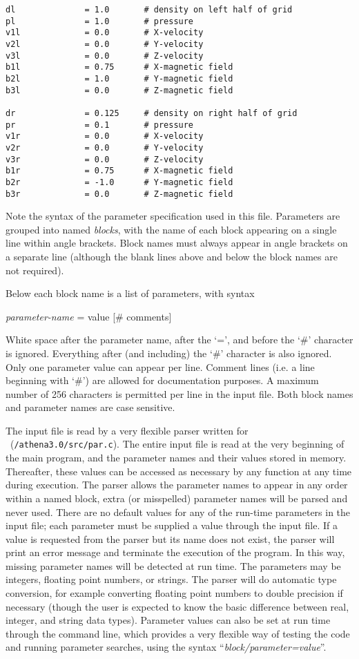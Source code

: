 \begin{verbatim}
dl              = 1.0       # density on left half of grid
pl              = 1.0       # pressure
v1l             = 0.0       # X-velocity
v2l             = 0.0       # Y-velocity
v3l             = 0.0       # Z-velocity
b1l             = 0.75      # X-magnetic field
b2l             = 1.0       # Y-magnetic field
b3l             = 0.0       # Z-magnetic field

dr              = 0.125     # density on right half of grid
pr              = 0.1       # pressure
v1r             = 0.0       # X-velocity
v2r             = 0.0       # Y-velocity
v3r             = 0.0       # Z-velocity
b1r             = 0.75      # X-magnetic field
b2r             = -1.0      # Y-magnetic field
b3r             = 0.0       # Z-magnetic field
\end{verbatim}
\normalsize

Note the syntax of the parameter specification used in this file.
Parameters are grouped into named {\it blocks}, with the name of each
block appearing on a single line within angle brackets.  Block names
must always appear in angle brackets on a separate line (although the
blank lines above and below the block names are not required).

Below each block name is a list of parameters, with syntax
\begin{center}
 {\it parameter-name} = value [\# comments]
\end{center}
White space after the parameter name, after the `=', and before the
`\#' character is ignored.  Everything after (and including) the `\#'
character is also ignored.  Only one parameter value can appear per
line.  Comment lines (i.e. a line beginning with `\#') are allowed for
documentation purposes.  A maximum number of 256 characters is permitted
per line in the input file.  Both block names and parameter names are
case sensitive.

The input file is read by a very flexible parser written for \ath\
({\tt /athena3.0/src/par.c}).  The entire input file is read at the
very beginning of the main program, and the parameter names and their
values stored in memory.  Thereafter, these values can be accessed as
necessary by any function at any time during execution.  The parser
allows the parameter names to appear in any order within a named
block, extra (or misspelled) parameter names will be parsed and never
used.  There are no default values for any of the run-time parameters
in the input file; each parameter must be supplied a value through the
input file.  If a value is requested from the parser but its name does
not exist, the parser will print an error message and terminate the
execution of the program.  In this way, missing
parameter names will be detected at run time.  The parameters may be
integers, floating point numbers, or strings.  The parser will do
automatic type conversion, for example converting floating point
numbers to double precision if necessary (though the user is expected
to know the basic difference between real, integer, and string data
types).  Parameter values can also be set at run time through the
command line, which provides a very flexible way of testing the code
and running parameter searches,
using the syntax ``{\it block/parameter=value}''.

